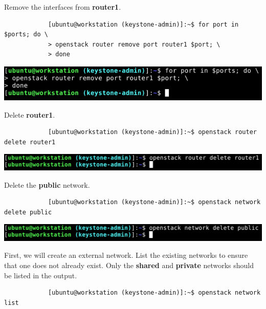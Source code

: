 \documentclass[letterpaper, 12pt]{article}
\begin{document}
\begin{enumerate}
    \begin{labstep}
        Remove the interfaces from \textbf{router1}.
        \begin{lstlisting}
            [ubuntu@workstation (keystone-admin)]:~$ for port in $ports; do \
            > openstack router remove port router1 $port; \
            > done
        \end{lstlisting}

        \begin{center}
            \includegraphics[width=\linewidth]{images/part9/step6.png}
        \end{center}
    \end{labstep}

    \begin{labstep}
        Delete \textbf{router1}.
        \begin{lstlisting}
            [ubuntu@workstation (keystone-admin)]:~$ openstack router delete router1
        \end{lstlisting}

        \begin{center}
            \includegraphics[width=\linewidth]{images/part9/step7.png}
        \end{center}
    \end{labstep}

    \begin{labstep}
        Delete the \textbf{public} network.
        \begin{lstlisting}
            [ubuntu@workstation (keystone-admin)]:~$ openstack network delete public
        \end{lstlisting}

        \begin{center}
            \includegraphics[width=\linewidth]{images/part9/step8.png}
        \end{center}
    \end{labstep}

    \begin{labstep}
        First, we will create an external network.
        List the existing networks to ensure that one does not already exist.
        Only the \textbf{shared} and \textbf{private} networks should be listed in the output.
        \begin{lstlisting}
            [ubuntu@workstation (keystone-admin)]:~$ openstack network list
        \end{lstlisting}


\end{labstep}
\end{enumerate}
\end{document}
